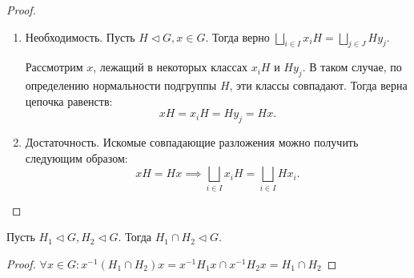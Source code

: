\begin{proof}~
    \begin{enumerate}
        \item Необходимость. Пусть $H \vartriangleleft G, x \in G$. Тогда верно
        $\underset{i \in I}{\bigsqcup} x_iH = \underset{j \in J}{\bigsqcup} Hy_j$.

        Рассмотрим $x$, лежащий в некоторых классах $x_iH$ и $Hy_j$. В таком случае, по определению нормальности 
        подгруппы $H$, эти классы совпадают. Тогда верна цепочка равенств:
        $$xH = x_iH = Hy_j = Hx.$$
        \item  Достаточность. Искомые совпадающие разложения можно получить следующим образом:
        $$xH = Hx \implies \bigsqcup_{i \in I} x_iH = \bigsqcup_{i \in I} Hx_i.$$
    \end{enumerate}
\end{proof}
    
\begin{proposition}
    Пусть $H_1 \vartriangleleft G, H_2 \vartriangleleft G$. Тогда $H_1 \cap H_2 \vartriangleleft G$.
\end{proposition}

\begin{proof}
    $\forall x \in G: x^{-1}(H_1 \cap H_2)x = x^{-1}H_1x \cap x^{-1}H_2x = H_1 \cap H_2$
\end{proof}


